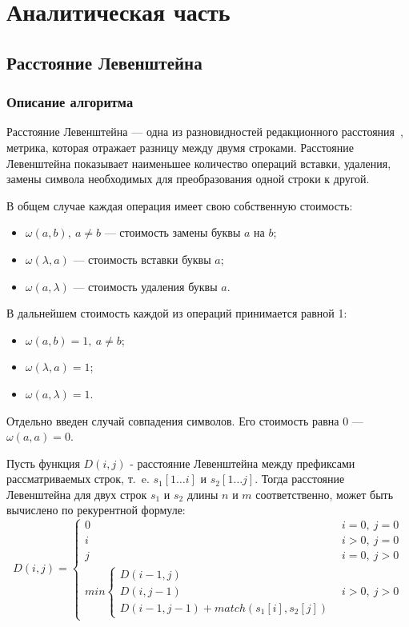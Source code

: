 \chapter{Аналитическая часть}

\section{Расстояние Левенштейна}

\subsection{Описание алгоритма}

Расстояние Левенштейна --- одна из разновидностей редакционного расстояния~\cite{navaro01}, метрика, которая отражает разницу между двумя строками. Расстояние Левенштейна показывает наименьшее количество операций вставки, удаления, замены символа необходимых для преобразования одной строки к другой.

В общем случае каждая операция имеет свою собственную стоимость:
\begin{itemize}[label=---]
	\item $\omega(a, b),\ a \neq b$ --- стоимость замены буквы $a$ на $b$;
	\item $\omega(\lambda, a)$ --- стоимость вставки буквы $a$;
	\item $\omega(a, \lambda)$ --- стоимость удаления буквы $a$.
\end{itemize}

В дальнейшем стоимость каждой из операций принимается равной 1:
\begin{itemize}[label=---]
	\item $\omega(a, b) = 1,\ a \neq b$;
	\item $\omega(\lambda, a) = 1$;
	\item $\omega(a, \lambda) = 1$.
\end{itemize}

Отдельно введен случай совпадения символов. Его стоимость равна 0 --- $\omega(a, a) = 0$.

Пусть функция $D(i, j)$ - расстояние Левенштейна между префиксами рассматриваемых строк, т.~e. $s_1[1\dots i]$ и $s_2[1\ldots j]$. Тогда расстояние Левенштейна для двух строк $s_1$ и $s_2$ длины $n$ и $m$ соответственно, может быть вычислено по рекурентной формуле:
\begin{equation}
	\label{eq:levenstein}
	D(i, j) = 
	\begin{cases}
		0 & i=0,~j=0\\
		i &i > 0,~j = 0\\
		j &i = 0,~j > 0\\
		min\begin{cases}
			D(i-1, j)\\
			D(i, j-1)\\
			D(i-1, j-1) + match(s_1[i], s_2[j])
		\end{cases} & i > 0,~j > 0
	\end{cases}
\end{equation}

